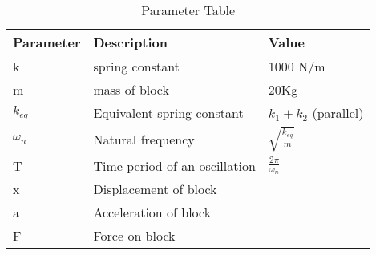 \begin{table}[!ht] 
\centering
\setlength{\extrarowheight}{8pt}
\begin{tabular}{|l|l|l|}
    \hline
    \textbf{Parameter} & \textbf{Description} & \textbf{Value} \\
    \hline
     k & spring constant & 1000 N/m \\
    \hline
     m & mass of block & 20Kg \\
    \hline
      $k_{eq}$& Equivalent spring constant& $k_1 + k_2$ (parallel)\\
    \hline
     $\omega_n$ & Natural frequency & $\sqrt{\frac{k_{eq}}{m}}$ \\
    \hline
    T & Time period of an oscillation & $\frac{2\pi}{\omega_n}$ \\
    \hline
    x & Displacement of block & \\
    \hline
    a & Acceleration of block & \\
    \hline
    F & Force on block & \\
    \hline
  \end{tabular}
  \vspace{4mm}
 \caption{Parameter Table}
 \label{tab:table0}
\end{table}
